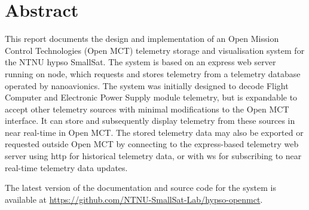 \begin{comment}

\end{comment}

\section{Abstract}

This report documents the design and implementation of an Open Mission Control Technologies (Open MCT) \gls{telemetry} storage and visualisation system for the NTNU \acrshort{hypso} SmallSat. The system is based on an \Gls{express} web server running on \Gls{node}, which requests and stores telemetry from a telemetry database operated by \Gls{nanoavionics}. The system was initially designed to decode Flight Computer and Electronic Power Supply module telemetry, but is expandable to accept other telemetry sources with minimal modifications to the Open MCT interface. It can store and subsequently display telemetry from these sources in near real-time in Open MCT. The stored telemetry data may also be exported or requested outside Open MCT by connecting to the \Gls{express}-based telemetry web server using \acrshort{http} for historical telemetry data, or with \Gls{ws} for subscribing to near real-time telemetry data updates.

The latest version of the documentation and source code for the system is available at \url{https://github.com/NTNU-SmallSat-Lab/hypso-openmct}.

\clearpage